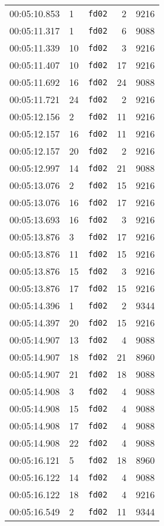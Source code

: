 \documentclass{article}
\begin{document}
\begin{longtable}{lllrr}
00:05:10.853 & 1 & \texttt{fd02} & 2 & 9216 \\
00:05:11.317 & 1 & \texttt{fd02} & 6 & 9088 \\
00:05:11.339 & 10 & \texttt{fd02} & 3 & 9216 \\
00:05:11.407 & 10 & \texttt{fd02} & 17 & 9216 \\
00:05:11.692 & 16 & \texttt{fd02} & 24 & 9088 \\
00:05:11.721 & 24 & \texttt{fd02} & 2 & 9216 \\
00:05:12.156 & 2 & \texttt{fd02} & 11 & 9216 \\
00:05:12.157 & 16 & \texttt{fd02} & 11 & 9216 \\
00:05:12.157 & 20 & \texttt{fd02} & 2 & 9216 \\
00:05:12.997 & 14 & \texttt{fd02} & 21 & 9088 \\
00:05:13.076 & 2 & \texttt{fd02} & 15 & 9216 \\
00:05:13.076 & 16 & \texttt{fd02} & 17 & 9216 \\
00:05:13.693 & 16 & \texttt{fd02} & 3 & 9216 \\
00:05:13.876 & 3 & \texttt{fd02} & 17 & 9216 \\
00:05:13.876 & 11 & \texttt{fd02} & 15 & 9216 \\
00:05:13.876 & 15 & \texttt{fd02} & 3 & 9216 \\
00:05:13.876 & 17 & \texttt{fd02} & 15 & 9216 \\
00:05:14.396 & 1 & \texttt{fd02} & 2 & 9344 \\
00:05:14.397 & 20 & \texttt{fd02} & 15 & 9216 \\
00:05:14.907 & 13 & \texttt{fd02} & 4 & 9088 \\
00:05:14.907 & 18 & \texttt{fd02} & 21 & 8960 \\
00:05:14.907 & 21 & \texttt{fd02} & 18 & 9088 \\
00:05:14.908 & 3 & \texttt{fd02} & 4 & 9088 \\
00:05:14.908 & 15 & \texttt{fd02} & 4 & 9088 \\
00:05:14.908 & 17 & \texttt{fd02} & 4 & 9088 \\
00:05:14.908 & 22 & \texttt{fd02} & 4 & 9088 \\
00:05:16.121 & 5 & \texttt{fd02} & 18 & 8960 \\
00:05:16.122 & 14 & \texttt{fd02} & 4 & 9088 \\
00:05:16.122 & 18 & \texttt{fd02} & 4 & 9216 \\
00:05:16.549 & 2 & \texttt{fd02} & 11 & 9344 \\

\end{longtable}
\end{document}
